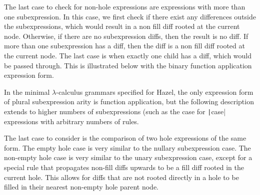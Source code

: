 The last case to check for non-hole expressions are expressions with more than one subexpression. In this case, we first check if there exist any differences outside the subexpressions, which would result in a non fill diff rooted at the current node. Otherwise, if there are no subexpression diffs, then the result is no diff. If more than one subexpression has a diff, then the diff is a non fill diff rooted at the current node. The last case is when exactly one child has a diff, which would be passed through. This is illustrated below with the binary function application expression form.

\begin{singlespace}
\end{singlespace}

In the minimal $\lambda$-calculus grammars specified for Hazel, the only expression form of plural subexpression arity is function application, but the following description extends to higher numbers of subexpressions (such as the case for \texttt|case| expressions with arbitrary numbers of rules.

The last case to consider is the comparison of two hole expressions of the same form. The empty hole case is very similar to the nullary subexpression case. The non-empty hole case is very similar to the unary subexpression case, except for a special rule that propagates non-fill diffs upwards to be a fill diff rooted in the current hole. This allows for diffs that are not rooted directly in a hole to be filled in their nearest non-empty hole parent node.

